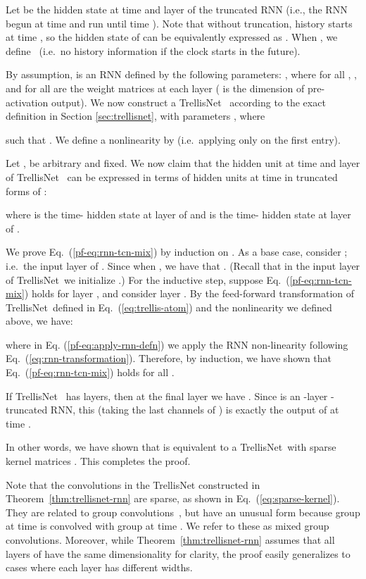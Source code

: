\documentclass{article} \usepackage{iclr2019_conference,times}
\newcommand{\model}{TrellisNet}
\newenvironment{proofidx}[1]{\renewcommand{\proofname}{Proof of Theorem #1}\proof}{\endproof}
\begin{document}
\vspace{-.1in}
\begin{proofidx}{\ref{thm:trellisnet-rnn}}
Let  be the hidden state at time  and layer  of the truncated RNN  (i.e., the RNN begun at time  and run until time ). Note that without truncation, history starts at time , so the hidden state  of  can be equivalently expressed as . When , we define \small\normalsize~(i.e.\ no history information if the clock starts in the future).

By assumption,  is an RNN defined by the following parameters: , where  for all , , and  for all  are the weight matrices at each layer ( is the dimension of pre-activation output). We now construct a \model~ according to the exact definition in Section \ref{sec:trellisnet}, with parameters , where

such that . We define a nonlinearity  by  (i.e.\ applying  only on the first entry).

Let  ,  be arbitrary and fixed. We now claim that the hidden unit at time  and layer  of \model~ can be expressed in terms of hidden units at time  in truncated forms of :

where  is the time- hidden state at layer  of  and  is the time- hidden state at layer  of .

We prove Eq.~(\ref{pf-eq:rnn-tcn-mix}) by induction on . As a base case, consider ; i.e.\ the input layer of . Since  when , we have that \small\normalsize. (Recall that in the input layer of \model~we initialize \small\normalsize.) For the inductive step, suppose Eq.~(\ref{pf-eq:rnn-tcn-mix}) holds for layer , and consider layer . By the feed-forward transformation of \model~defined in Eq.~(\ref{eq:trellis-atom}) and the nonlinearity  we defined above, we have:

where in Eq. (\ref{pf-eq:apply-rnn-defn}) we apply the RNN non-linearity  following Eq.~(\ref{eq:rnn-transformation}). Therefore, by induction, we have shown that Eq.~(\ref{pf-eq:rnn-tcn-mix}) holds for all .

If \model~ has  layers, then at the final layer we have \small\normalsize. Since  is an -layer -truncated RNN, this (taking the last  channels of ) is exactly the output of  at time .

In other words, we have shown that  is equivalent to a \model~with sparse kernel matrices . This completes the proof.
\end{proofidx}

Note that the convolutions in the TrellisNet  constructed in Theorem~\ref{thm:trellisnet-rnn} are sparse, as shown in Eq.~(\ref{eq:sparse-kernel}). They are related to group convolutions~\citep{krizhevsky2012imagenet}, but have an unusual form because group  at time  is convolved with group  at time . We refer to these as mixed group convolutions. Moreover, while Theorem~\ref{thm:trellisnet-rnn} assumes that all layers of  have the same dimensionality  for clarity, the proof easily generalizes to cases where each layer has different widths.
\end{document}

